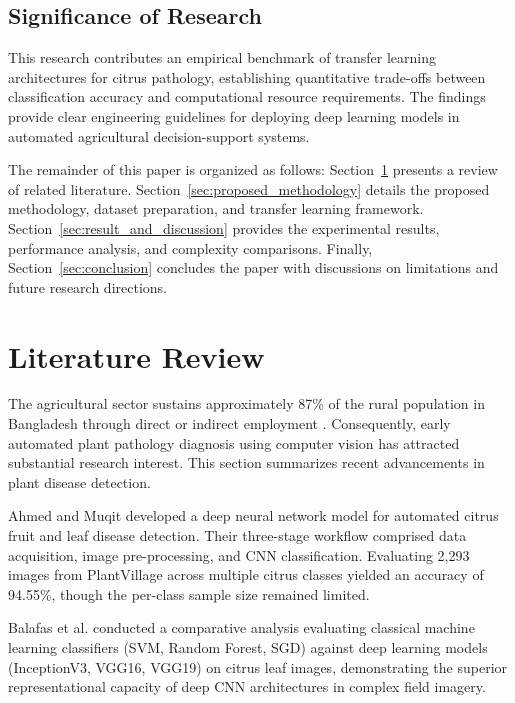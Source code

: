 \documentclass{ijcaArticle}
\begin{document}
\subsection{Significance of Research}
This research contributes an empirical benchmark of transfer learning architectures for citrus pathology, establishing quantitative trade-offs between classification accuracy and computational resource requirements. The findings provide clear engineering guidelines for deploying deep learning models in automated agricultural decision-support systems.

The remainder of this paper is organized as follows: Section~\ref{sec:literature_review} presents a review of related literature. Section~\ref{sec:proposed_methodology} details the proposed methodology, dataset preparation, and transfer learning framework. Section~\ref{sec:result_and_discussion} provides the experimental results, performance analysis, and complexity comparisons. Finally, Section~\ref{sec:conclusion} concludes the paper with discussions on limitations and future research directions.

\section{Literature Review}
\label{sec:literature_review}

The agricultural sector sustains approximately 87\% of the rural population in Bangladesh through direct or indirect employment \cite{p9}. Consequently, early automated plant pathology diagnosis using computer vision has attracted substantial research interest. This section summarizes recent advancements in plant disease detection.

Ahmed and Muqit \cite{p2} developed a deep neural network model for automated citrus fruit and leaf disease detection. Their three-stage workflow comprised data acquisition, image pre-processing, and CNN classification. Evaluating 2,293 images from PlantVillage across multiple citrus classes yielded an accuracy of 94.55\%, though the per-class sample size remained limited.

Balafas et al. \cite{p3} conducted a comparative analysis evaluating classical machine learning classifiers (SVM, Random Forest, SGD) against deep learning models (InceptionV3, VGG16, VGG19) on citrus leaf images, demonstrating the superior representational capacity of deep CNN architectures in complex field imagery.
\end{document}
